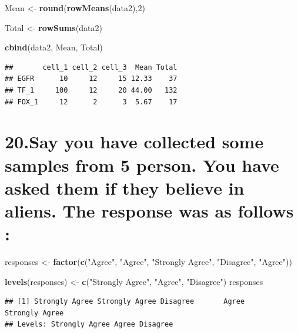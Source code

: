 \documentclass[]{article}
\newenvironment{Shaded}{\begin{snugshade}}{\end{snugshade}}
\newcommand{\DecValTok}[1]{\textcolor[rgb]{0.00,0.00,0.81}{#1}}
\newcommand{\KeywordTok}[1]{\textcolor[rgb]{0.13,0.29,0.53}{\textbf{#1}}}
\newcommand{\NormalTok}[1]{#1}
\newcommand{\StringTok}[1]{\textcolor[rgb]{0.31,0.60,0.02}{#1}}
\begin{document}
\begin{Shaded}
\begin{Highlighting}[]
\NormalTok{Mean <-}\StringTok{ }\KeywordTok{round}\NormalTok{(}\KeywordTok{rowMeans}\NormalTok{(data2),}\DecValTok{2}\NormalTok{)}

\NormalTok{Total <-}\StringTok{ }\KeywordTok{rowSums}\NormalTok{(data2)}

\KeywordTok{cbind}\NormalTok{(data2, Mean, Total)}
\end{Highlighting}
\end{Shaded}

\begin{verbatim}
##       cell_1 cell_2 cell_3  Mean Total
## EGFR      10     12     15 12.33    37
## TF_1     100     12     20 44.00   132
## FOX_1     12      2      3  5.67    17
\end{verbatim}

\hypertarget{say-you-have-collected-some-samples-from-5-person.-you-have-asked-them-if-they-believe-in-aliens.-the-response-was-as-follows}{%
\section{20.Say you have collected some samples from 5 person. You have
asked them if they believe in aliens. The response was as follows
:}\label{say-you-have-collected-some-samples-from-5-person.-you-have-asked-them-if-they-believe-in-aliens.-the-response-was-as-follows}}

\begin{Shaded}
\begin{Highlighting}[]
\NormalTok{responses <-}\StringTok{ }\KeywordTok{factor}\NormalTok{(}\KeywordTok{c}\NormalTok{(}\StringTok{"Agree"}\NormalTok{, }\StringTok{"Agree"}\NormalTok{, }\StringTok{"Strongly Agree"}\NormalTok{, }\StringTok{"Disagree"}\NormalTok{, }\StringTok{"Agree"}\NormalTok{))}

\KeywordTok{levels}\NormalTok{(responses) <-}\StringTok{ }\KeywordTok{c}\NormalTok{(}\StringTok{"Strongly Agree"}\NormalTok{,  }\StringTok{"Agree"}\NormalTok{, }\StringTok{"Disagree"}\NormalTok{)}
\NormalTok{responses}
\end{Highlighting}
\end{Shaded}

\begin{verbatim}
## [1] Strongly Agree Strongly Agree Disagree       Agree          Strongly Agree
## Levels: Strongly Agree Agree Disagree
\end{verbatim}
\end{document}
